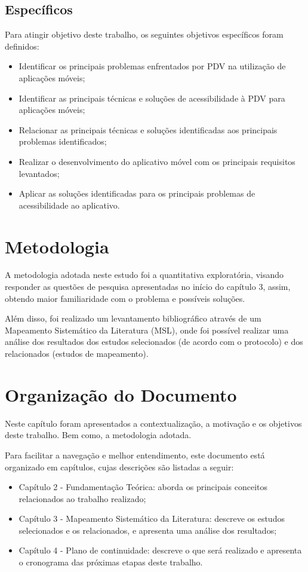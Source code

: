 \subsection{Específicos}

Para atingir objetivo deste trabalho, os seguintes objetivos específicos foram definidos:

\begin{itemize}
    \item Identificar os principais problemas enfrentados por PDV na utilização de aplicações móveis;
    \item Identificar as principais técnicas e soluções de acessibilidade à PDV para aplicações móveis;
    \item Relacionar as principais técnicas e soluções identificadas aos principais problemas identificados;
    \item Realizar o desenvolvimento do aplicativo móvel com os principais requisitos levantados;
    \item Aplicar as soluções identificadas para os principais problemas de acessibilidade ao aplicativo.
\end{itemize}

\section{Metodologia}

A metodologia adotada neste estudo foi a quantitativa exploratória, visando responder as questões de pesquisa apresentadas
no início do capítulo 3, assim, obtendo maior familiaridade com o problema e possíveis soluções.

Além disso, foi realizado um levantamento bibliográfico através de um Mapeamento Sistemático da Literatura (MSL), onde foi possível
realizar uma análise dos resultados dos estudos selecionados (de acordo com o protocolo) e dos relacionados (estudos de mapeamento).

\section{Organização do Documento}
Neste capítulo foram apresentados a contextualização, a motivação e os objetivos deste trabalho. Bem como, a metodologia adotada.

Para facilitar a navegação e melhor entendimento, este documento está organizado em capítulos, cujas descrições são listadas a seguir:
\begin{itemize}
    \item Capítulo 2 - Fundamentação Teórica: aborda os principais conceitos relacionados ao trabalho realizado;
    \item Capítulo 3 - Mapeamento Sistemático da Literatura: descreve os estudos selecionados e os relacionados, e apresenta uma análise dos resultados;
    \item Capítulo 4 - Plano de continuidade: descreve o que será realizado e apresenta o cronograma das próximas etapas deste trabalho.
\end{itemize}
